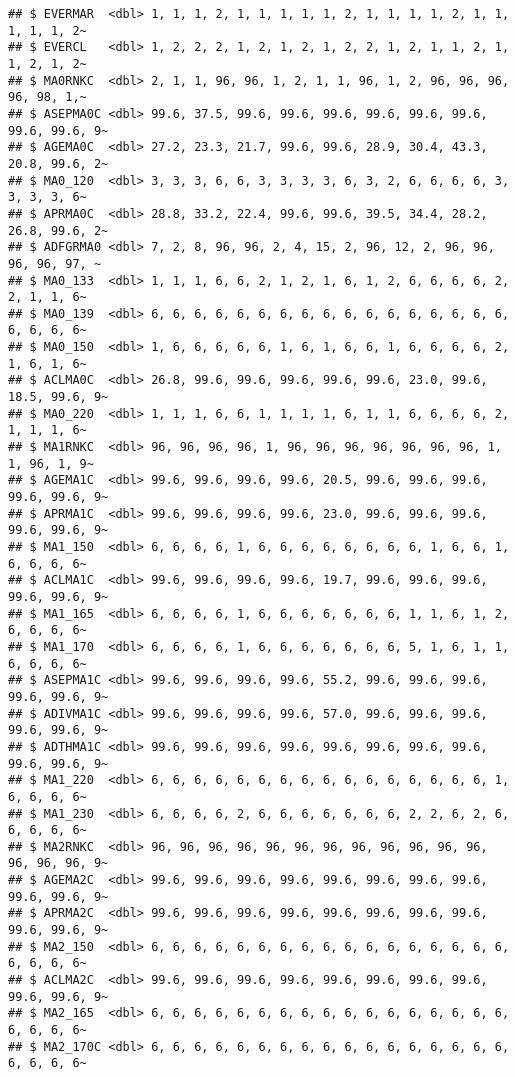 \documentclass[
]{article}
\begin{document}
\begin{verbatim}
## $ EVERMAR  <dbl> 1, 1, 1, 2, 1, 1, 1, 1, 1, 2, 1, 1, 1, 1, 2, 1, 1, 1, 1, 1, 2~
## $ EVERCL   <dbl> 1, 2, 2, 2, 1, 2, 1, 2, 1, 2, 2, 1, 2, 1, 1, 2, 1, 1, 2, 1, 2~
## $ MA0RNKC  <dbl> 2, 1, 1, 96, 96, 1, 2, 1, 1, 96, 1, 2, 96, 96, 96, 96, 98, 1,~
## $ ASEPMA0C <dbl> 99.6, 37.5, 99.6, 99.6, 99.6, 99.6, 99.6, 99.6, 99.6, 99.6, 9~
## $ AGEMA0C  <dbl> 27.2, 23.3, 21.7, 99.6, 99.6, 28.9, 30.4, 43.3, 20.8, 99.6, 2~
## $ MA0_120  <dbl> 3, 3, 3, 6, 6, 3, 3, 3, 3, 6, 3, 2, 6, 6, 6, 6, 3, 3, 3, 3, 6~
## $ APRMA0C  <dbl> 28.8, 33.2, 22.4, 99.6, 99.6, 39.5, 34.4, 28.2, 26.8, 99.6, 2~
## $ ADFGRMA0 <dbl> 7, 2, 8, 96, 96, 2, 4, 15, 2, 96, 12, 2, 96, 96, 96, 96, 97, ~
## $ MA0_133  <dbl> 1, 1, 1, 6, 6, 2, 1, 2, 1, 6, 1, 2, 6, 6, 6, 6, 2, 2, 1, 1, 6~
## $ MA0_139  <dbl> 6, 6, 6, 6, 6, 6, 6, 6, 6, 6, 6, 6, 6, 6, 6, 6, 6, 6, 6, 6, 6~
## $ MA0_150  <dbl> 1, 6, 6, 6, 6, 6, 1, 6, 1, 6, 6, 1, 6, 6, 6, 6, 2, 1, 6, 1, 6~
## $ ACLMA0C  <dbl> 26.8, 99.6, 99.6, 99.6, 99.6, 99.6, 23.0, 99.6, 18.5, 99.6, 9~
## $ MA0_220  <dbl> 1, 1, 1, 6, 6, 1, 1, 1, 1, 6, 1, 1, 6, 6, 6, 6, 2, 1, 1, 1, 6~
## $ MA1RNKC  <dbl> 96, 96, 96, 96, 1, 96, 96, 96, 96, 96, 96, 96, 1, 1, 96, 1, 9~
## $ AGEMA1C  <dbl> 99.6, 99.6, 99.6, 99.6, 20.5, 99.6, 99.6, 99.6, 99.6, 99.6, 9~
## $ APRMA1C  <dbl> 99.6, 99.6, 99.6, 99.6, 23.0, 99.6, 99.6, 99.6, 99.6, 99.6, 9~
## $ MA1_150  <dbl> 6, 6, 6, 6, 1, 6, 6, 6, 6, 6, 6, 6, 6, 1, 6, 6, 1, 6, 6, 6, 6~
## $ ACLMA1C  <dbl> 99.6, 99.6, 99.6, 99.6, 19.7, 99.6, 99.6, 99.6, 99.6, 99.6, 9~
## $ MA1_165  <dbl> 6, 6, 6, 6, 1, 6, 6, 6, 6, 6, 6, 6, 1, 1, 6, 1, 2, 6, 6, 6, 6~
## $ MA1_170  <dbl> 6, 6, 6, 6, 1, 6, 6, 6, 6, 6, 6, 6, 5, 1, 6, 1, 1, 6, 6, 6, 6~
## $ ASEPMA1C <dbl> 99.6, 99.6, 99.6, 99.6, 55.2, 99.6, 99.6, 99.6, 99.6, 99.6, 9~
## $ ADIVMA1C <dbl> 99.6, 99.6, 99.6, 99.6, 57.0, 99.6, 99.6, 99.6, 99.6, 99.6, 9~
## $ ADTHMA1C <dbl> 99.6, 99.6, 99.6, 99.6, 99.6, 99.6, 99.6, 99.6, 99.6, 99.6, 9~
## $ MA1_220  <dbl> 6, 6, 6, 6, 6, 6, 6, 6, 6, 6, 6, 6, 6, 6, 6, 6, 1, 6, 6, 6, 6~
## $ MA1_230  <dbl> 6, 6, 6, 6, 2, 6, 6, 6, 6, 6, 6, 6, 2, 2, 6, 2, 6, 6, 6, 6, 6~
## $ MA2RNKC  <dbl> 96, 96, 96, 96, 96, 96, 96, 96, 96, 96, 96, 96, 96, 96, 96, 9~
## $ AGEMA2C  <dbl> 99.6, 99.6, 99.6, 99.6, 99.6, 99.6, 99.6, 99.6, 99.6, 99.6, 9~
## $ APRMA2C  <dbl> 99.6, 99.6, 99.6, 99.6, 99.6, 99.6, 99.6, 99.6, 99.6, 99.6, 9~
## $ MA2_150  <dbl> 6, 6, 6, 6, 6, 6, 6, 6, 6, 6, 6, 6, 6, 6, 6, 6, 6, 6, 6, 6, 6~
## $ ACLMA2C  <dbl> 99.6, 99.6, 99.6, 99.6, 99.6, 99.6, 99.6, 99.6, 99.6, 99.6, 9~
## $ MA2_165  <dbl> 6, 6, 6, 6, 6, 6, 6, 6, 6, 6, 6, 6, 6, 6, 6, 6, 6, 6, 6, 6, 6~
## $ MA2_170C <dbl> 6, 6, 6, 6, 6, 6, 6, 6, 6, 6, 6, 6, 6, 6, 6, 6, 6, 6, 6, 6, 6~

\end{verbatim}
\end{document}

